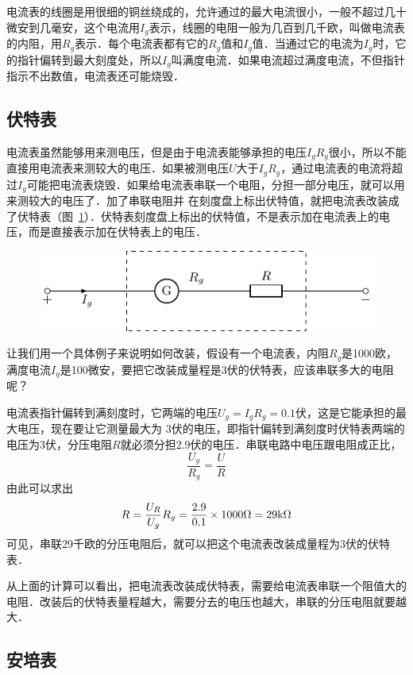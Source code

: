 电流表的线圈是用很细的铜丝绕成的，允许通过的最大电流很小，一般不超过几十微安到几毫安，这个电流用$I_g$表示，线圈的电阻一般为几百到几千欧，叫做电流表的内阻，用$R_g$表示．每个电流表都有它的$R_g$值和$I_g$值．当通过它的电流为$I_g$时，它的指针偏转到最大刻度处，所以$I_g$叫满度电流．如果电流超过满度电流，不但指针指示不出数值，电流表还可能烧毁．

\subsection{伏特表}


电流表虽然能够用来测电压，但是由于电流表能够承担的电压$I_gR_g$很小，所以不能直接用电流表来测较大的电压．如果被测电压$U$大于$I_gR_g$，通过电流表的电流将超过$I_g$可能把电流表烧毁．如果给电流表串联一个电阻，分担一部分电压，就可以用来测较大的电压了．加了串联电阻并
在刻度盘上标出伏特值，就把电流表改装成了伏特表（图~\ref{fig_B_7-16}）．伏特表刻度盘上标出的伏特值，不是表示加在电流表上的电压，而是直接表示加在伏特表上的电压．
\begin{figure}[htbp]
    \centering
    \includegraphics{fig/B/7-16.pdf}
    \caption{}\label{fig_B_7-16}
\end{figure}

让我们用一个具体例子来说明如何改装，假设有一个电流表，内阻$R_g$是1000欧，满度电流$I_g$是100微安，要把它改装成量程是3伏的伏特表，应该串联多大的电阻呢？

电流表指针偏转到满刻度时，它两端的电压$U_g=I_gR_g=0.1$伏，这是它能承担的最大电压，现在要让它测量最大为
3伏的电压，即指针偏转到满刻度时伏特表两端的电压为3伏，分压电阻$R$就必须分担2.9伏的电压．串联电路中电压跟电阻成正比，
\[\frac{U_g}{R_g}=\frac{U}{R}\]
由此可以求出
\[R=\frac{U_R}{U_g}R_g=\frac{2.9}{0.1}\times 1000\Omega=29{\rm k}\Omega\]
可见，串联29千欧的分压电阻后，就可以把这个电流表改装成量程为3伏的伏特表．

从上面的计算可以看出，把电流表改装成伏特表，需要给电流表串联一个阻值大的电阻．改装后的伏特表量程越大，需要分去的电压也越大，串联的分压电阻就要越大．

\subsection{安培表}


